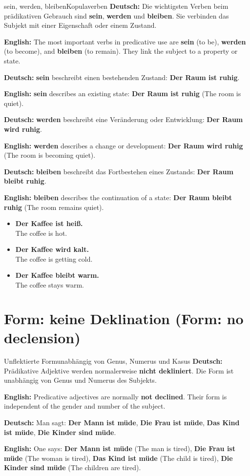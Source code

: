 \documentclass[a4paper,11pt]{article}
\newcommand{\GermanText}[1]{\textbf{Deutsch: }#1\par}
\newcommand{\EnglishText}[1]{{\small\color{SoftGray}\textbf{English: }#1\par}}
\newcommand{\ExampleItem}[2]{\item \textbf{#1}\\{\small\color{SoftGray}#2}}
\begin{document}
        \begin{grammarentry}{sein, werden, bleiben}{Kopulaverben}
            \GermanText{Die wichtigsten Verben beim prädikativen Gebrauch sind \textbf{sein}, \textbf{werden} und \textbf{bleiben}. Sie verbinden das Subjekt mit einer Eigenschaft oder einem Zustand.}
            \EnglishText{The most important verbs in predicative use are \textbf{sein} (to be), \textbf{werden} (to become), and \textbf{bleiben} (to remain). They link the subject to a property or state.}

            \GermanText{\textbf{sein} beschreibt einen bestehenden Zustand: \textbf{Der Raum ist ruhig}.}
            \EnglishText{\textbf{sein} describes an existing state: \textbf{Der Raum ist ruhig} (The room is quiet).}

            \GermanText{\textbf{werden} beschreibt eine Veränderung oder Entwicklung: \textbf{Der Raum wird ruhig}.}
            \EnglishText{\textbf{werden} describes a change or development: \textbf{Der Raum wird ruhig} (The room is becoming quiet).}

            \GermanText{\textbf{bleiben} beschreibt das Fortbestehen eines Zustands: \textbf{Der Raum bleibt ruhig}.}
            \EnglishText{\textbf{bleiben} describes the continuation of a state: \textbf{Der Raum bleibt ruhig} (The room remains quiet).}
        \end{grammarentry}

        \begin{exbox}
            \begin{itemize}
                \ExampleItem{Der Kaffee ist heiß.}{The coffee is hot.}
                \ExampleItem{Der Kaffee wird kalt.}{The coffee is getting cold.}
                \ExampleItem{Der Kaffee bleibt warm.}{The coffee stays warm.}
            \end{itemize}
        \end{exbox}

    \section{Form: keine Deklination \textnormal{(Form: no declension)}}

        \begin{grammarentry}{Unflektierte Form}{unabhängig von Genus, Numerus und Kasus}
            \GermanText{Prädikative Adjektive werden normalerweise \textbf{nicht dekliniert}. Die Form ist unabhängig von Genus und Numerus des Subjekts.}
            \EnglishText{Predicative adjectives are normally \textbf{not declined}. Their form is independent of the gender and number of the subject.}

            \GermanText{Man sagt: \textbf{Der Mann ist müde}, \textbf{Die Frau ist müde}, \textbf{Das Kind ist müde}, \textbf{Die Kinder sind müde}.}
            \EnglishText{One says: \textbf{Der Mann ist müde} (The man is tired), \textbf{Die Frau ist müde} (The woman is tired), \textbf{Das Kind ist müde} (The child is tired), \textbf{Die Kinder sind müde} (The children are tired).}
        \end{grammarentry}
\end{document}

